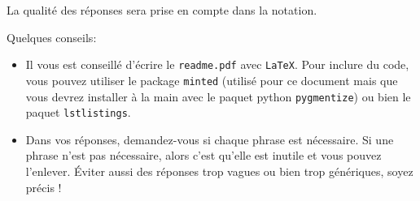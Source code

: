 \documentclass[11pt]{article}
\begin{document}
La qualité des réponses sera prise en compte dans la notation.

Quelques conseils:
\begin{itemize}
\item Il vous est conseillé d'écrire le \texttt{readme.pdf} avec \texttt{LaTeX}. Pour inclure du code, vous pouvez utiliser le package \texttt{minted} (utilisé pour ce document mais que vous devrez installer à la main avec le paquet python \texttt{pygmentize}) ou bien le paquet \texttt{lstlistings}.
\item Dans vos réponses, demandez-vous si chaque phrase est nécessaire. Si une phrase n'est pas nécessaire, alors c'est qu'elle est inutile et vous pouvez l'enlever. Éviter aussi des réponses trop vagues ou bien trop génériques, soyez précis !
\end{itemize}
\end{document}
